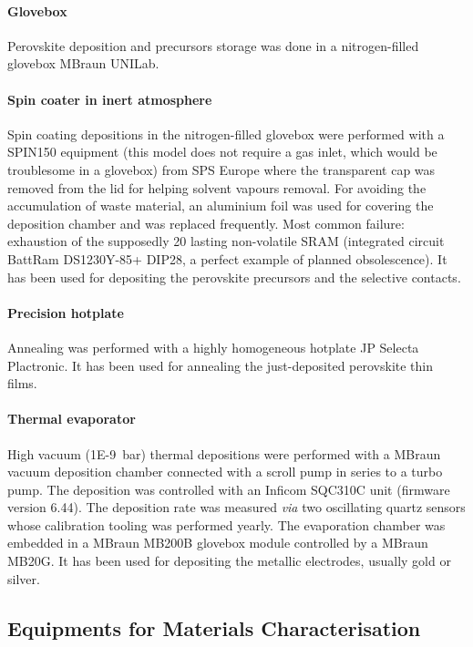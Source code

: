 		\paragraph{Glovebox}
		Perovskite deposition and precursors storage was done in a nitrogen-filled glovebox MBraun UNILab.

		\paragraph{Spin coater in inert atmosphere}
		Spin coating depositions in the nitrogen-filled glovebox were performed with a SPIN150 equipment (this model does not require a gas inlet, which would be troublesome in a glovebox) from SPS Europe where the transparent cap was removed from the lid for helping solvent vapours removal.
		For avoiding the accumulation of waste material, an aluminium foil was used for covering the deposition chamber and was replaced frequently.
		Most common failure: exhaustion of the supposedly \SI{20}{\year} lasting non-volatile SRAM (integrated circuit BattRam DS1230Y-85+ DIP28, a perfect example of planned obsolescence).
		It has been used for depositing the perovskite precursors and the  selective contacts.

		\paragraph{Precision hotplate}
		Annealing was performed with a highly homogeneous hotplate JP Selecta Plactronic.
		It has been used for annealing the just-deposited perovskite thin films.

		\paragraph{Thermal evaporator}
		High vacuum (\SI{1E-9}{\bar}) thermal depositions were performed with a MBraun vacuum deposition chamber connected with a scroll pump in series to a turbo pump.
		The deposition was controlled with an Inficom SQC310C unit (firmware version 6.44).
		The deposition rate was measured \textsl{via} two oscillating quartz sensors whose calibration tooling was performed yearly.
		The evaporation chamber was embedded in a MBraun MB200B glovebox module controlled by a MBraun MB20G.
		It has been used for depositing the metallic electrodes, usually gold or silver.

	\subsection{Equipments for Materials Characterisation}

